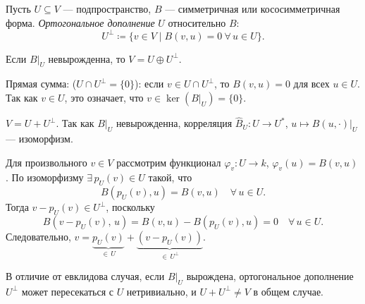 \begin{definition}
    Пусть $U \subseteq V$ --- подпространство, $B$ --- симметричная или кососимметричная форма. \emph{Ортогональное дополнение} $U$ относительно $B$:
    \[
        U^\perp \coloneqq \{v \in V \mid B(v, u) = 0\ \forall\, u \in U\}.
    \]
\end{definition}

\begin{theorem}
    Если $B\big|_U$ невырожденна, то $V = U \oplus U^\perp$.
    \begin{proofsteps}
        \item Прямая сумма: ($U \cap U^\perp = \{0\}$): если $v \in U \cap U^\perp$, то $B(v, u) = 0$ для всех $u \in U$. Так как $v \in U$, это означает, что $v \in \ker(B\big|_U) = \{0\}$.

        \item $V = U + U^\perp$. Так как $B\big|_U$ невырожденна, корреляция $\hat{B}_U\colon U \to U^*$, $u \mapsto B(u, \cdot)\big|_U$ --- изоморфизм.

        Для произвольного $v \in V$ рассмотрим функционал $\varphi_v\colon U \to k$, $\varphi_v(u) = B(v, u)$. По изоморфизму $\exists\, p_U(v) \in U$ такой, что
        \[
            B(p_U(v), u) = B(v, u) \quad \forall\, u \in U.
        \]
        Тогда $v - p_U(v) \in U^\perp$, поскольку
        \[
            B(v - p_U(v),\, u) = B(v, u) - B(p_U(v), u) = 0 \quad \forall\, u \in U.
        \]
        Следовательно, $v = \underbrace{p_U(v)}_{\in\, U} + \underbrace{(v - p_U(v))}_{\in\, U^\perp}$.
    \end{proofsteps}
\end{theorem}


\begin{remark}
    В отличие от евклидова случая, если $B\big|_U$ вырождена, ортогональное дополнение $U^\perp$ может пересекаться с $U$ нетривиально, и $U + U^\perp \neq V$ в общем случае.
\end{remark}

